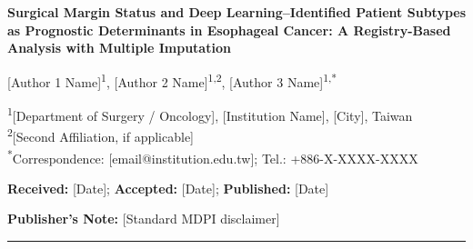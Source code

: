 \documentclass[12pt,a4paper]{article}
\begin{document}
\begin{titlepage}
\vspace*{1cm}

\begin{center}
{\LARGE\bfseries Surgical Margin Status and Deep Learning--Identified
Patient Subtypes as Prognostic Determinants in Esophageal Cancer:
A Registry-Based Analysis with Multiple Imputation\par}

\vspace{1.2cm}

{\large
[Author 1 Name]\textsuperscript{1},
[Author 2 Name]\textsuperscript{1,2},
[Author 3 Name]\textsuperscript{1,*}\par}

\vspace{0.6cm}

{\normalsize
\textsuperscript{1}[Department of Surgery / Oncology],
[Institution Name], [City], Taiwan\\
\textsuperscript{2}[Second Affiliation, if applicable]\\[0.3em]
\textsuperscript{*}Correspondence: [email@institution.edu.tw];
Tel.: +886-X-XXXX-XXXX\par}

\vspace{1cm}

\textbf{Received:} [Date]; \textbf{Accepted:} [Date];
\textbf{Published:} [Date]

\vspace{0.3cm}
\textbf{Publisher's Note:} [Standard MDPI disclaimer]
\end{center}

\vspace{1.5cm}

\noindent\rule{\linewidth}{0.4pt}
\vspace{0.3em}


\end{titlepage}
\end{document}
